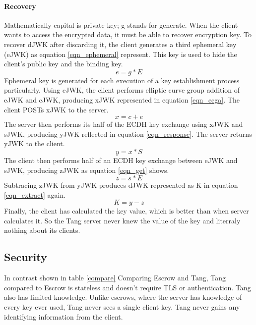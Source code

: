 \paragraph{Recovery}
Mathematically capital is private key; g stands for generate.
When the client wants to access the encrypted data, it must be able to recover encryption key.
To recover dJWK after discarding it, the client generates a third ephemeral key (eJWK) as equation \ref{eqn_ephemeral} represent.
This key is used to hide the client's public key and the binding key.
\begin{equation}\label{eqn_ephemeral}
    e = g * E
\end{equation}
Ephemeral key is generated for each execution of a key establishment process particularly.
Using eJWK, the client performs elliptic curve group addition of eJWK and cJWK, producing xJWK represented in equation \ref{eqn_ecga}.
The client POSTs xJWK to the server.
\begin{equation}\label{eqn_ecga}
    x = c + e
\end{equation}
The server then performs its half of the ECDH key exchange using xJWK and sJWK, producing yJWK reflected in equation \ref{eqn_response}. The server returns yJWK to the client.
\begin{equation}\label{eqn_response}
    y = x * S
\end{equation}
The client then performs half of an ECDH key exchange between eJWK and sJWK, producing zJWK as equation \ref{eqn_get} shows.
\begin{equation}\label{eqn_get}
    z = s * E
\end{equation}
Subtracing zJWK from yJWK produces dJWK represented as K in equation \ref{eqn_extract} again.
\begin{equation}\label{eqn_extract}
    K = y - z
\end{equation}
Finally, the client has calculated the key value, which is better than when server calculates it.
So the Tang server never knew the value of the key and literraly nothing about its clients.



\subsection{Security}

In contrast shown in table \ref{compare} Comparing Escrow and Tang, Tang compared to Escrow is stateless and doesn't require TLS or authentication.
Tang also has limited knowledge.
Unlike escrows, where the server has knowledge of every key ever used, Tang never sees a single client key.
Tang never gains any identifying information from the client.

